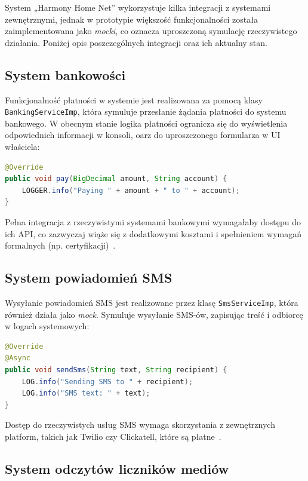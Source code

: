 System „Harmony Home Net” wykorzystuje kilka integracji z systemami zewnętrznymi, jednak w prototypie większość funkcjonalności została zaimplementowana jako \emph{mocki}, co oznacza uproszczoną symulację rzeczywistego działania. Poniżej opis poszczególnych integracji oraz ich aktualny stan.

\subsection{System bankowości}

Funkcjonalność płatności w systemie jest realizowana za pomocą klasy \texttt{BankingServiceImp}, która symuluje przesłanie żądania płatności do systemu bankowego. W obecnym stanie logika płatności ogranicza się do wyświetlenia odpowiednich informacji w konsoli, oarz do uproszczonego formularza w UI właściela:

\begin{lstlisting}[language=Java, caption=Fragment klasy \texttt{BankingServiceImp}]
@Override
public void pay(BigDecimal amount, String account) {
    LOGGER.info("Paying " + amount + " to " + account);
}
\end{lstlisting}

Pełna integracja z rzeczywistymi systemami bankowymi wymagałaby dostępu do ich API, co zazwyczaj wiąże się z dodatkowymi kosztami i spełnieniem wymagań formalnych (np. certyfikacji)~\cite{paypal_api, stripe_api}.

\subsection{System powiadomień SMS}

Wysyłanie powiadomień SMS jest realizowane przez klasę \texttt{SmsServiceImp}, która również działa jako \emph{mock}. Symuluje wysyłanie SMS-ów, zapisując treść i odbiorcę w logach systemowych:

\begin{lstlisting}[language=Java, caption=Fragment klasy \texttt{SmsServiceImp}]
@Override
@Async
public void sendSms(String text, String recipient) {
    LOG.info("Sending SMS to " + recipient);
    LOG.info("SMS text: " + text);
}
\end{lstlisting}

Dostęp do rzeczywistych usług SMS wymaga skorzystania z zewnętrznych platform, takich jak Twilio czy Clickatell, które są płatne~\cite{twilio, clickatell}.

\subsection{System odczytów liczników mediów}


